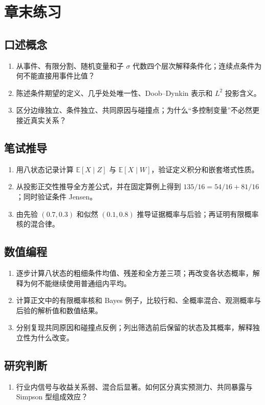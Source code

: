 \section*{章末练习}
\begingroup\small
\subsection*{口述概念}
\begin{enumerate}[nosep,leftmargin=*]
  \item 从事件、有限分割、随机变量和子 $\sigma$ 代数四个层次解释条件化；连续点条件为何不能直接用事件比值？
  \item 陈述条件期望的定义、几乎处处唯一性、Doob--Dynkin 表示和 $L^2$ 投影含义。
  \item 区分边缘独立、条件独立、共同原因与碰撞点；为什么“多控制变量”不必然更接近真实关系？
\end{enumerate}

\subsection*{笔试推导}
\begin{enumerate}[nosep,leftmargin=*]
  \item 用八状态记录计算 $\mathbb E[X\mid Z]$ 与 $\mathbb E[X\mid W]$，验证定义积分和嵌套塔式性质。
  \item 从投影正交性推导全方差公式，并在固定算例上得到 $135/16=54/16+81/16$；同时验证条件 Jensen。
  \item 由先验 $(0.7,0.3)$ 和似然 $(0.1,0.8)$ 推导证据概率与后验；再证明有限概率核的混合律。
\end{enumerate}

\subsection*{数值编程}
\begin{enumerate}[nosep,leftmargin=*]
  \item 逐步计算八状态的粗细条件均值、残差和全方差三项；再改变各状态概率，解释为何不能继续使用普通组内平均。
  \item 计算正文中的有限概率核和 Bayes 例子，比较行和、全概率混合、观测概率与后验的解析值和数值结果。
  \item 分别复现共同原因和碰撞点反例；列出筛选前后保留的状态及其概率，解释独立性为什么改变。
\end{enumerate}

\subsection*{研究判断}
\begin{enumerate}[nosep,leftmargin=*]
  \item 行业内信号与收益关系弱、混合后显著。如何区分真实预测力、共同暴露与 Simpson 型组成效应？
\end{enumerate}
\endgroup


\MFQMappedUpperChEightQuestions

